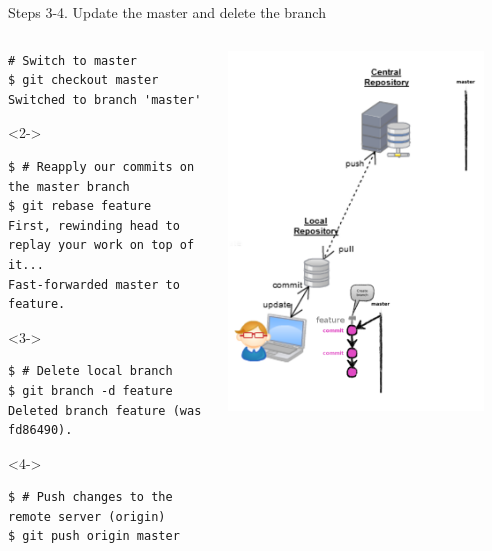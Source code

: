 \begin{frame}[fragile]{Steps 3-4. Update the master and delete the branch}
\begin{columns}
	\begin{column}{0.6\textwidth}
  	\begin{lstlisting}
# Switch to master
$ git checkout master
Switched to branch 'master' 
	\end{lstlisting}
	\begin{onlyenv}<2->
	\begin{lstlisting}
$ # Reapply our commits on the master branch
$ git rebase feature
First, rewinding head to replay your work on top of it...
Fast-forwarded master to feature.
	\end{lstlisting}
	\end{onlyenv}
	\begin{onlyenv}<3->
	\begin{lstlisting}
$ # Delete local branch
$ git branch -d feature
Deleted branch feature (was fd86490).
	\end{lstlisting}
	\end{onlyenv}
	\begin{onlyenv}<4->
	\begin{lstlisting}
$ # Push changes to the remote server (origin)
$ git push origin master
	\end{lstlisting}
	\end{onlyenv}
	\end{column}
	\begin{column}{0.4\textwidth}
		\begin{center}
			 {
				\includegraphics[width=0.9\textwidth]{branch_committed.png}
}
\end{center}
\end{column}
\end{columns}
\end{frame}
